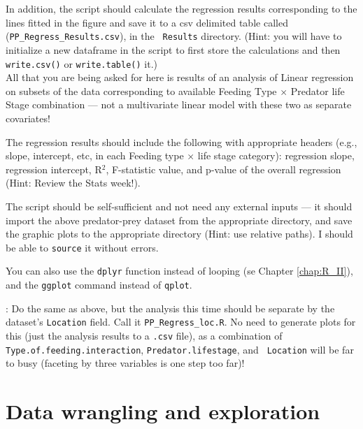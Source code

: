 \begin{compactitem}
	\item In addition, the script should calculate the regression results 
	corresponding to the lines fitted in the figure and save it to a csv 
	delimited table called ({\tt PP\_Regress\_Results.csv}), in the {\tt 
	Results} directory. (Hint: you will have to initialize a new 
	dataframe in the script to first store the calculations and then {\tt 
	write.csv()} or {\tt write.table()} it.) \\ 
	All that you are being asked for here is results of an analysis of 
	Linear regression on subsets of the data corresponding to available 
	Feeding Type $\times$ Predator life Stage combination --- not a 
	multivariate linear model with these two as separate covariates!

	\item The regression results should include the following with 
	appropriate headers (e.g., slope, intercept, etc, in each Feeding 
	type $\times$ life stage category): regression slope, regression 
	intercept, R$^2$, F-statistic value, and p-value of the overall 
	regression (Hint: Review the Stats week!).
 
 	\item The script should be self-sufficient and not need any 
	external inputs --- it should import the above predator-prey 
	dataset from the appropriate directory, and save the graphic plots 
	to the appropriate directory (Hint: use relative paths). I should 
	be able to {\tt source} it without errors.

	\item You can also use the {\tt dplyr} function instead of looping 
	(se Chapter \ref{chap:R_II}), and the {\tt ggplot} command 
	instead of {\tt qplot}.

\end{compactitem}

: Do the same as above, but the analysis 
this time should be separate by the dataset's {\tt Location} field. 
Call it {\tt PP\_Regress\_loc.R}. No need to generate plots for this 
(just the analysis results to a {\tt *.csv} file), as a combination of 
{\tt Type.of.feeding.interaction}, {\tt Predator.lifestage}, and {\tt 
Location} will be far to busy (faceting by three variables is one step 
too far)!

\section{Data wrangling and exploration} 

